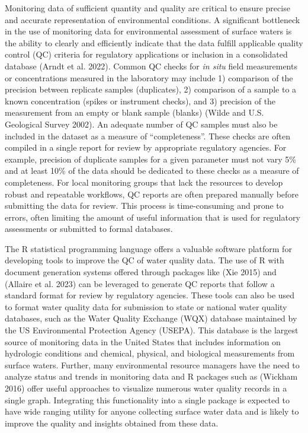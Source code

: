 Monitoring data of sufficient quantity and quality are critical to ensure precise and accurate representation of environmental conditions. A significant bottleneck in the use of monitoring data for environmental assessment of surface waters is the ability to clearly and efficiently indicate that the data fulfill applicable quality control (QC) criteria for regulatory applications or inclusion in a consolidated database (Arndt et al. 2022). Common QC checks for \emph{in situ} field measurements or concentrations measured in the laboratory may include 1) comparison of the precision between replicate samples (duplicates), 2) comparison of a sample to a known concentration (spikes or instrument checks), and 3) precision of the measurement from an empty or blank sample (blanks) (Wilde and U.S. Geological Survey 2002). An adequate number of QC samples must also be included in the dataset as a measure of ``completeness''. These checks are often compiled in a single report for review by appropriate regulatory agencies. For example, precision of duplicate samples for a given parameter must not vary 5\% and at least 10\% of the data should be dedicated to these checks as a measure of completeness. For local monitoring groups that lack the resources to develop robust and repeatable workflows, QC reports are often prepared manually before submitting the data for review. This process is time-consuming and prone to errors, often limiting the amount of useful information that is used for regulatory assessments or submitted to formal databases.

The R statistical programming language offers a valuable software platform for developing tools to improve the QC of water quality data. The use of R with document generation systems offered through packages like  (Xie 2015) and  (Allaire et al. 2023) can be leveraged to generate QC reports that follow a standard format for review by regulatory agencies. These tools can also be used to format water quality data for submission to state or national water quality databases, such as the Water Quality Exchange (WQX) database maintained by the US Environmental Protection Agency (USEPA). This database is the largest source of monitoring data in the United States that includes information on hydrologic conditions and chemical, physical, and biological measurements from surface waters. Further, many environmental resource managers have the need to analyze status and trends in monitoring data and R packages such as  (Wickham 2016) offer useful approaches to visualize numerous water quality records in a single graph. Integrating this functionality into a single package is expected to have wide ranging utility for anyone collecting surface water data and is likely to improve the quality and insights obtained from these data.

